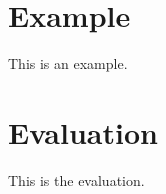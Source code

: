 \documentclass[sigconf,nonacm]{acmart}
\begin{document}
    \section{Example}
        This is an example.

    \section{Evaluation}
        This is the evaluation.
\end{document}
